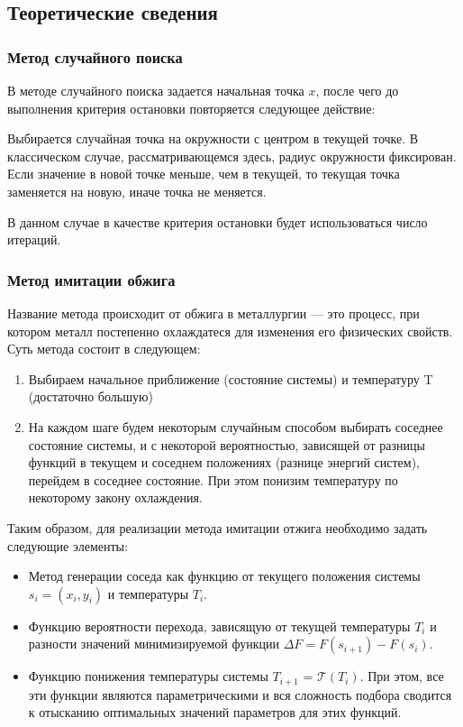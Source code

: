 \documentclass{article}
\theoremstyle{definition}
\begin{document}
\subsection{Теоретические сведения}

\subsubsection{Метод случайного поиска}

В методе случайного поиска задается начальная точка $x$, после чего до выполнения критерия остановки повторяется следующее действие:

Выбирается случайная точка на окружности с центром в текущей точке. В классическом случае, рассматривающемся здесь, радиус окружности фиксирован. Если значение в новой точке меньше, чем в текущей, то текущая точка заменяется на новую, иначе точка не меняется.

В данном случае в качестве критерия остановки будет использоваться число итераций.

\subsubsection{Метод имитации обжига}

Название метода происходит от обжига в металлургии — это процесс, при котором металл постепенно охлаждатеся для изменения его физических свойств. Суть метода состоит в следующем:
\begin{enumerate}
    \item Выбираем начальное приближение (состояние системы) и температуру T (достаточно большую)
    \item На каждом шаге будем некоторым случайным способом выбирать соседнее состояние системы, и с некоторой вероятностью, зависящей от разницы функций в текущем и соседнем положениях (разнице энергий систем), перейдем в соседнее состояние. При этом понизим температуру по некоторому закону охлаждения.
\end{enumerate}

Таким образом, для реализации метода имитации отжига необходимо задать следующие элементы:
\begin{itemize}
    \item Метод генерации соседа как функцию от текущего положения системы $s_i = (x_i, y_i)$ и температуры $T_i$.
    \item Функцию вероятности перехода, зависящую от текущей температуры $T_i$ и разности значений минимизируемой функции $\Delta F = F(s_{i+1}) - F(s_i)$.
    \item Функцию понижения температуры системы \(T_{i+1}\) = $\mathcal{T}(T_i)$.
При этом, все эти функции являются параметрическими и вся сложность подбора сводится к отысканию оптимальных значений параметров для этих функций.
\end{itemize}
\end{document}
